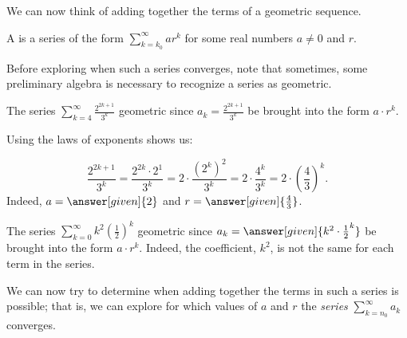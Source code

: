 \documentclass{ximera}
\begin{document}
We can now think of adding together the terms of a geometric sequence.

\begin{definition}
  A  is a series of the form $\sum_{k=k_0}^\infty ar^k$
  for some real numbers $a \ne 0$ and $r$.
\end{definition}

Before exploring when such a series converges, note that sometimes, some preliminary algebra is necessary to recognize a series as geometric.

\begin{example}
The series $\sum_{k=4}^\infty \frac{2^{2k+1}}{3^k}$  geometric since $a_k =\frac{2^{2k+1}}{3^k}$  be brought into the form $a \cdot r^k$.  

Using the laws of exponents shows us:

\[
\frac{2^{2k+1}}{3^k} = \frac{2^{2k} \cdot 2^1}{3^k}= 2 \cdot \frac{\left(2^{k}\right)^2}{3^k} = 2 \cdot \frac{4^k}{3^k} = 2 \cdot \left(\frac{4}{3}\right)^k.
\]
Indeed, $a= \answer[given]{2}$ and $r = \answer[given]{\frac{4}{3}}$.
\end{example}

\begin{example}
The series $\sum_{k=0}^\infty k^2 \left(\frac{1}{2}\right)^k$  geometric since $a_k = \answer[given]{k^2 \cdot \frac{1}{2}^k}$  be brought into the form $a \cdot r^k$.  Indeed, the coefficient, $k^2$, is not the same for each term in the series.
\end{example}

We can now try to determine when adding together the terms in such a series is possible; that is, we can explore for which values of $a$ and $r$ the \emph{series} $\sum_{k=n_0}^{\infty} a_k$ converges.  
\end{document}
